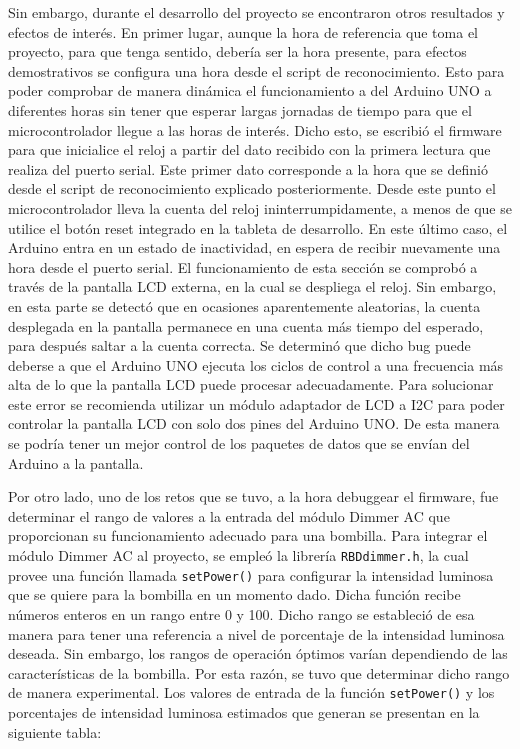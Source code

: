 Sin embargo, durante el desarrollo del proyecto se encontraron otros resultados y efectos de interés. En primer lugar, aunque la hora de referencia que toma el proyecto, para que tenga sentido, debería ser la hora presente, para efectos demostrativos se configura una hora desde el script de reconocimiento. Esto para poder comprobar de manera dinámica el funcionamiento a del Arduino UNO a diferentes horas sin tener que esperar largas jornadas de tiempo para que el microcontrolador llegue a las horas de interés. Dicho esto, se escribió el firmware para que inicialice el reloj a partir del dato recibido con la primera lectura que realiza del puerto serial. Este primer dato corresponde a la hora que se definió desde el script de reconocimiento explicado posteriormente. Desde este punto el microcontrolador lleva la cuenta del reloj ininterrumpidamente, a menos de que se utilice el botón reset integrado en la tableta de desarrollo. En este último caso, el Arduino entra en un estado de inactividad, en espera de recibir nuevamente una hora desde el puerto serial. El funcionamiento de esta sección se comprobó a través de la pantalla LCD externa, en la cual se despliega el reloj. Sin embargo, en esta parte se detectó que en ocasiones aparentemente aleatorias, la cuenta desplegada en la pantalla permanece en una cuenta más tiempo del esperado, para después saltar a la cuenta correcta. Se determinó que dicho bug puede deberse a que el Arduino UNO ejecuta los ciclos de control a una frecuencia más alta de lo que la pantalla LCD puede procesar adecuadamente. Para solucionar este error se recomienda utilizar un módulo adaptador de LCD a I2C para poder controlar la pantalla LCD con solo dos pines del Arduino UNO. De esta manera se podría tener un mejor control de los paquetes de datos que se envían del Arduino a la pantalla.

Por otro lado, uno de los retos que se tuvo, a la hora debuggear el firmware, fue determinar el rango de valores a la entrada del módulo Dimmer AC que proporcionan su funcionamiento adecuado para una bombilla. Para integrar el módulo Dimmer AC al proyecto, se empleó la librería \texttt{RBDdimmer.h}, la cual provee una función llamada \texttt{setPower()} para configurar la intensidad luminosa que se quiere para la bombilla en un momento dado. Dicha función recibe números enteros en un rango entre 0 y 100. Dicho rango se estableció de esa manera para tener una referencia a nivel de porcentaje de la intensidad luminosa deseada. Sin embargo, los rangos de operación óptimos varían dependiendo de las características de la bombilla. Por esta razón, se tuvo que determinar dicho rango de manera experimental. Los valores de entrada de la función \texttt{setPower()} y los porcentajes de intensidad luminosa estimados que generan se presentan en la siguiente tabla:

